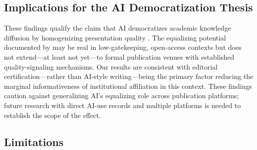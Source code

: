 \documentclass[12pt,a4paper]{article}
\begin{document}
\subsection{Implications for the AI Democratization Thesis}

These findings qualify the claim that AI democratizes academic
knowledge diffusion by homogenizing presentation quality
\citep{Liang2024}.
The equalizing potential documented by \citet{JoLi2026} may be
real in low-gatekeeping, open-access contexts but does not extend---at
least not yet---to formal publication venues with established
quality-signaling mechanisms.
Our results are consistent with editorial certification---rather than
AI-style writing---being the primary factor reducing the marginal
informativeness of institutional affiliation in this context.
These findings caution against generalizing AI's equalizing role
across publication platforms; future research with direct AI-use
records and multiple platforms is needed to establish the scope of
the effect.

\subsection{Limitations}
\end{document}
